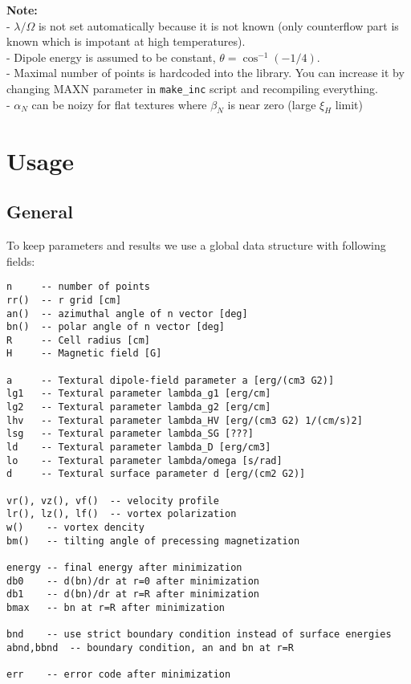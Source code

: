 \documentclass[a4paper]{article}
\begin{document}
{\bf Note:}\\
- $\lambda/\Omega$ is not set automatically because it is not known
  (only counterflow part is known which is impotant at high temperatures).\\
- Dipole energy is assumed to be constant, $\theta=\cos^{-1}(-1/4)$.\\
- Maximal number of points is hardcoded into the library. You can
  increase it by changing MAXN parameter in {\tt make\_inc} script and
  recompiling everything.\\
- $\alpha_N$ can be noizy for flat textures where $\beta_N$ is near zero
  (large $\xi_H$ limit)\\

\eject
\section*{Usage}

\subsection*{General}
To keep parameters and results we use a global data structure with following fields:

\begin{verbatim}
n     -- number of points
rr()  -- r grid [cm]
an()  -- azimuthal angle of n vector [deg]
bn()  -- polar angle of n vector [deg]
R     -- Cell radius [cm]
H     -- Magnetic field [G]

a     -- Textural dipole-field parameter a [erg/(cm3 G2)]
lg1   -- Textural parameter lambda_g1 [erg/cm]
lg2   -- Textural parameter lambda_g2 [erg/cm]
lhv   -- Textural parameter lambda_HV [erg/(cm3 G2) 1/(cm/s)2]
lsg   -- Textural parameter lambda_SG [???]
ld    -- Textural parameter lambda_D [erg/cm3]
lo    -- Textural parameter lambda/omega [s/rad]
d     -- Textural surface parameter d [erg/(cm2 G2)]

vr(), vz(), vf()  -- velocity profile
lr(), lz(), lf()  -- vortex polarization
w()    -- vortex dencity
bm()   -- tilting angle of precessing magnetization

energy -- final energy after minimization
db0    -- d(bn)/dr at r=0 after minimization
db1    -- d(bn)/dr at r=R after minimization
bmax   -- bn at r=R after minimization

bnd    -- use strict boundary condition instead of surface energies
abnd,bbnd  -- boundary condition, an and bn at r=R

err    -- error code after minimization
\end{verbatim}
\end{document}
